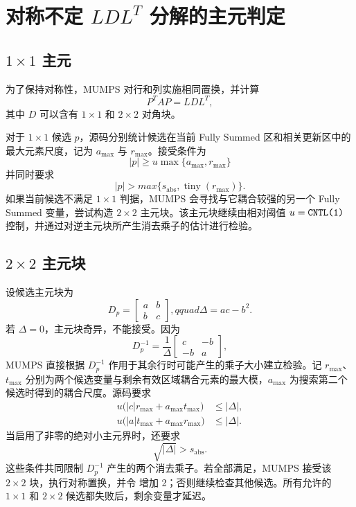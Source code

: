 \section{对称不定 $LDL^{T}$ 分解的主元判定}

\subsection{$1\times1$ 主元}

为了保持对称性，MUMPS 对行和列实施相同置换，并计算
\[
P^{T}AP=LDL^{T},
\]
其中 $D$ 可以含有 $1\times1$ 和 $2\times2$ 对角块。

对于 $1\times1$ 候选 $p$，源码分别统计候选在当前 Fully Summed 区和相关更新区中的最大元素尺度，记为 $a_{\max}$ 与 $r_{\max}$。接受条件为
\begin{equation}
\boxed{
|p|\ge u\max\{a_{\max},r_{\max}\}
}
\label{eq:mumps-ldlt-1x1-rel}
\end{equation}
并同时要求
\begin{equation}
|p|>max\{s_{\mathrm{abs}},\operatorname{tiny}(r_{\max})\}.
\label{eq:mumps-ldlt-1x1-abs}
\end{equation}
如果当前候选不满足 $1\times1$ 判据，MUMPS 会寻找与它耦合较强的另一个 Fully Summed 变量，尝试构造 $2\times2$ 主元块。该主元块继续由相对阈值 $u=\texttt{CNTL(1)}$ 控制，并通过对逆主元块所产生消去乘子的估计进行检验。

\subsection{$2\times2$ 主元块}

设候选主元块为
\[
D_p=
\begin{bmatrix}
a & b\\
b & c
\end{bmatrix},qquad
\Delta=ac-b^2.
\]
若 $\Delta=0$，主元块奇异，不能接受。因为
\[
D_p^{-1}
=\frac{1}{\Delta}
\begin{bmatrix}
c & -b\\
-b & a
\end{bmatrix},
\]
MUMPS 直接根据 $D_p^{-1}$ 作用于其余行时可能产生的乘子大小建立检验。记 $r_{\max}$、$t_{\max}$ 分别为两个候选变量与剩余有效区域耦合元素的最大模，$a_{\max}$ 为搜索第二个候选时得到的耦合尺度。源码要求
\begin{align}
u\bigl(|c|r_{\max}+a_{\max}t_{\max}\bigr)
  &\le |\Delta|,\label{eq:mumps-2x2-a}\\
u\bigl(|a|t_{\max}+a_{\max}r_{\max}\bigr)
  &\le |\Delta|.\label{eq:mumps-2x2-b}
\end{align}
当启用了非零的绝对小主元界时，还要求
\begin{equation}
\sqrt{|\Delta|}>s_{\mathrm{abs}}.
\label{eq:mumps-2x2-abs}
\end{equation}
这些条件共同限制 $D_p^{-1}$ 产生的两个消去乘子。若全部满足，MUMPS 接受该 $2\times2$ 块，执行对称置换，并令  增加 2；否则继续检查其他候选。所有允许的 $1\times1$ 和 $2\times2$ 候选都失败后，剩余变量才延迟。

